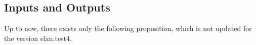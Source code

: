 \documentclass{article}
\begin{document}
\newcommand{\Set}[0]{{\bf List}}

\newcommand{\ter}[1]    {{\tt #1}}

\newlength{\largeurtexte}
\setlength{\largeurtexte}{134mm} %

\newcommand{\lban}[0]{ (  {\kern -2pt} [ }
\newcommand{\rban}[0]{ ]  {\kern -2pt} ) }


\subsection{Inputs and Outputs}

Up to now, 
there exists only the following proposition, 
which is not updated for the version elan.test4.

\end{document}

